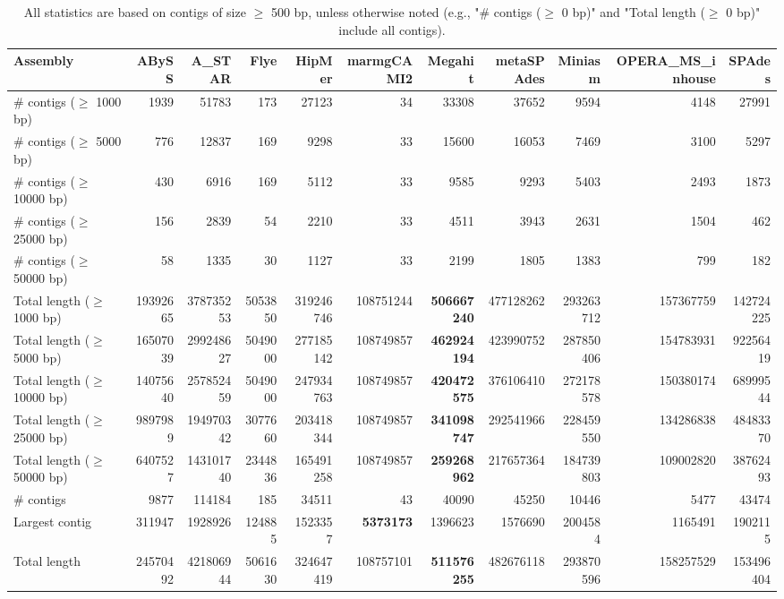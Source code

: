 \documentclass[12pt,a4paper]{article}
\begin{document}
\begin{table}[ht]
\begin{center}
\caption{All statistics are based on contigs of size $\geq$ 500 bp, unless otherwise noted (e.g., "\# contigs ($\geq$ 0 bp)" and "Total length ($\geq$ 0 bp)" include all contigs).}
\begin{tabular}{|l*{10}{|r}|}
\hline
Assembly & ABySS & A\_STAR & Flye & HipMer & marmgCAMI2 & Megahit & metaSPAdes & Miniasm & OPERA\_MS\_inhouse & SPAdes \\ \hline
\# contigs ($\geq$ 1000 bp) & 1939 & 51783 & 173 & 27123 & 34 & 33308 & 37652 & 9594 & 4148 & 27991 \\ \hline
\# contigs ($\geq$ 5000 bp) & 776 & 12837 & 169 & 9298 & 33 & 15600 & 16053 & 7469 & 3100 & 5297 \\ \hline
\# contigs ($\geq$ 10000 bp) & 430 & 6916 & 169 & 5112 & 33 & 9585 & 9293 & 5403 & 2493 & 1873 \\ \hline
\# contigs ($\geq$ 25000 bp) & 156 & 2839 & 54 & 2210 & 33 & 4511 & 3943 & 2631 & 1504 & 462 \\ \hline
\# contigs ($\geq$ 50000 bp) & 58 & 1335 & 30 & 1127 & 33 & 2199 & 1805 & 1383 & 799 & 182 \\ \hline
Total length ($\geq$ 1000 bp) & 19392665 & 378735253 & 5053850 & 319246746 & 108751244 & {\bf 506667240} & 477128262 & 293263712 & 157367759 & 142724225 \\ \hline
Total length ($\geq$ 5000 bp) & 16507039 & 299248627 & 5049000 & 277185142 & 108749857 & {\bf 462924194} & 423990752 & 287850406 & 154783931 & 92256419 \\ \hline
Total length ($\geq$ 10000 bp) & 14075640 & 257852459 & 5049000 & 247934763 & 108749857 & {\bf 420472575} & 376106410 & 272178578 & 150380174 & 68999544 \\ \hline
Total length ($\geq$ 25000 bp) & 9897989 & 194970342 & 3077660 & 203418344 & 108749857 & {\bf 341098747} & 292541966 & 228459550 & 134286838 & 48483370 \\ \hline
Total length ($\geq$ 50000 bp) & 6407527 & 143101740 & 2344836 & 165491258 & 108749857 & {\bf 259268962} & 217657364 & 184739803 & 109002820 & 38762493 \\ \hline
\# contigs & 9877 & 114184 & 185 & 34511 & 43 & 40090 & 45250 & 10446 & 5477 & 43474 \\ \hline
Largest contig & 311947 & 1928926 & 124885 & 1523357 & {\bf 5373173} & 1396623 & 1576690 & 2004584 & 1165491 & 1902115 \\ \hline
Total length & 24570492 & 421806944 & 5061630 & 324647419 & 108757101 & {\bf 511576255} & 482676118 & 293870596 & 158257529 & 153496404 \\ \hline

\end{tabular}
\end{center}
\end{table}
\end{document}
